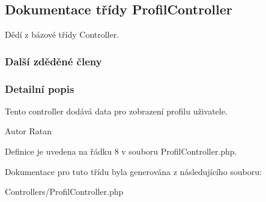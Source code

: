 \hypertarget{class_profil_controller}{\subsection{Dokumentace třídy Profil\-Controller}
\label{class_profil_controller}
}


Dědí z bázové třídy Controller.

\subsubsection*{Další zděděné členy}


\subsubsection{Detailní popis}
Tento controller dodává data pro zobrazení profilu uživatele. \begin{DoxyAuthor}{Autor}
Ratan 
\end{DoxyAuthor}


Definice je uvedena na řádku 8 v souboru Profil\-Controller.\-php.



Dokumentace pro tuto třídu byla generována z následujícího souboru\-:\begin{DoxyCompactItemize}
\item 
Controllers/Profil\-Controller.\-php\end{DoxyCompactItemize}
